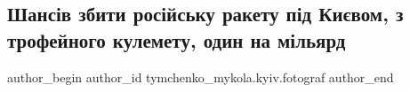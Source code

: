  
 
 
 
 
 
\subsection{Шансів збити російську ракету під Києвом, з трофейного кулемету, один на мільярд}
\label{sec:18_12_2022.fb.tymchenko_mykola.kyiv.fotograf.1.zbyty_raketu}
 
\ifcmt
 author_begin
   author_id tymchenko_mykola.kyiv.fotograf
 author_end
\fi
